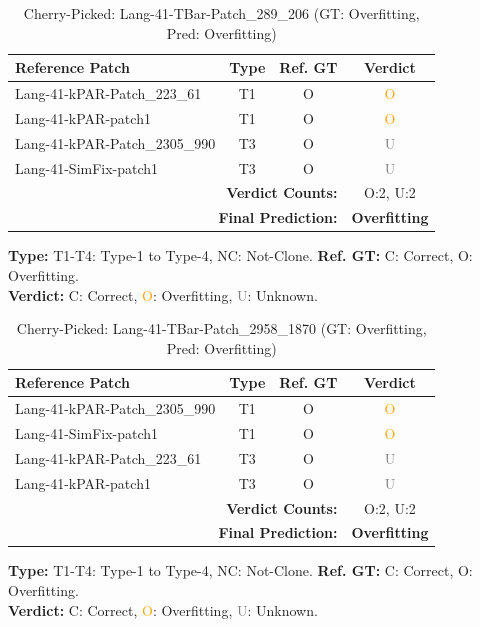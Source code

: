 \begin{table}[t]
\centering
\caption{Cherry-Picked: Lang-41-TBar-Patch\_289\_206 (GT: Overfitting, Pred: Overfitting)}
\label{tab:cherry-Lang41TBarPatch289206}
\footnotesize
\renewcommand{\arraystretch}{1.1}
\setlength{\tabcolsep}{4pt}
\begin{tabular}{l|c|c|c}
\hline
\textbf{Reference Patch} & \textbf{Type} & \textbf{Ref. GT} & \textbf{Verdict} \\
\hline
Lang-41-kPAR-Patch\_223\_61 & T1 & O & \textcolor{orange}{O} \\
Lang-41-kPAR-patch1 & T1 & O & \textcolor{orange}{O} \\
Lang-41-kPAR-Patch\_2305\_990 & T3 & O & \textcolor{gray}{U} \\
Lang-41-SimFix-patch1 & T3 & O & \textcolor{gray}{U} \\
\hline
\multicolumn{3}{r|}{\textbf{Verdict Counts:}} & O:2, U:2 \\
\multicolumn{3}{r|}{\textbf{Final Prediction:}} & \textbf{Overfitting} \\
\hline
\end{tabular}
\vspace{1mm}
\parbox{\linewidth}{\centering\footnotesize 
\vspace{1mm}
\textbf{Type:} T1-T4: Type-1 to Type-4, NC: Not-Clone. \;
\textbf{Ref. GT:} C: Correct, O: Overfitting. \\
\textbf{Verdict:} \textcolor{green!60!black}{C}: Correct, \textcolor{orange}{O}: Overfitting, \textcolor{gray}{U}: Unknown.}
\end{table}


\begin{table}[t]
\centering
\caption{Cherry-Picked: Lang-41-TBar-Patch\_2958\_1870 (GT: Overfitting, Pred: Overfitting)}
\label{tab:cherry-Lang41TBarPatch29581870}
\footnotesize
\renewcommand{\arraystretch}{1.1}
\setlength{\tabcolsep}{4pt}
\begin{tabular}{l|c|c|c}
\hline
\textbf{Reference Patch} & \textbf{Type} & \textbf{Ref. GT} & \textbf{Verdict} \\
\hline
Lang-41-kPAR-Patch\_2305\_990 & T1 & O & \textcolor{orange}{O} \\
Lang-41-SimFix-patch1 & T1 & O & \textcolor{orange}{O} \\
Lang-41-kPAR-Patch\_223\_61 & T3 & O & \textcolor{gray}{U} \\
Lang-41-kPAR-patch1 & T3 & O & \textcolor{gray}{U} \\
\hline
\multicolumn{3}{r|}{\textbf{Verdict Counts:}} & O:2, U:2 \\
\multicolumn{3}{r|}{\textbf{Final Prediction:}} & \textbf{Overfitting} \\
\hline
\end{tabular}
\vspace{1mm}
\parbox{\linewidth}{\centering\footnotesize 
\vspace{1mm}
\textbf{Type:} T1-T4: Type-1 to Type-4, NC: Not-Clone. \;
\textbf{Ref. GT:} C: Correct, O: Overfitting. \\
\textbf{Verdict:} \textcolor{green!60!black}{C}: Correct, \textcolor{orange}{O}: Overfitting, \textcolor{gray}{U}: Unknown.}
\end{table}


